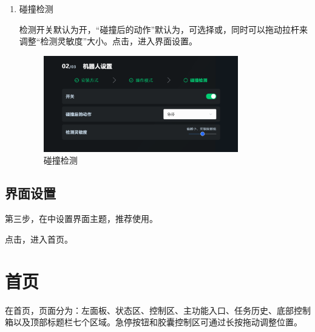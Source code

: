 \begin{enumerate}

\item 碰撞检测

	检测开关默认为开，“碰撞后的动作”默认为，可选择或，同时可以拖动拉杆来调整“检测灵敏度”大小。点击，进入界面设置。

	\begin{figure}[ht]
		\centering
		\includegraphics[width=0.8\textwidth]{screen/2-8.png}
		\caption{碰撞检测}
		\label{fig:碰撞检测}
	\end{figure}


\end{enumerate}


\subsection{界面设置}

第三步，在中设置界面主题，推荐使用。


点击，进入\LM 首页。


\section{首页}

在\LM 首页，页面分为：左面板、状态区、控制区、主功能入口、任务历史、底部控制箱以及顶部标题栏七个区域。急停按钮和胶囊控制区可通过长按拖动调整位置。

